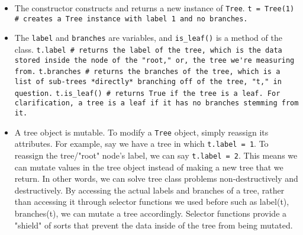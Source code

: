 \vspace{2mm}
\begin{itemize}
\item The constructor constructs and returns a new instance of \lstinline{Tree}.
    \subitem \lstinline{t = Tree(1) # creates a Tree instance with label 1 and no branches.}
\item The \lstinline{label} and \lstinline{branches} are variables, and \lstinline{is_leaf()} is a method of the class.
    \subitem \lstinline{t.label # returns the label of the tree, which is the data stored inside the node of the "root," or, the tree we're measuring from.}
    \subitem \lstinline{t.branches # returns the branches of the tree, which is a list of sub-trees *directly* branching off of the tree, "t," in question.}
    \subitem \lstinline{t.is_leaf() # returns True if the tree is a leaf. For clarification, a tree is a leaf if it has no branches stemming from it.}
\item A tree object is mutable.
    \subitem To modify a \lstinline{Tree} object, simply reassign its attributes. For example, say we have a tree in which \lstinline{t.label = 1}. To reassign the tree/"root" node's label, we can say \lstinline{t.label = 2}.
    \subitem This means we can mutate values in the tree object instead of making a new tree that we return. In other words, we can solve tree class problems non-destructively and destructively.
    \subitem By accessing the actual labels and branches of a tree, rather than accessing it through selector functions we used before such as label(t), branches(t), we can mutate a tree accordingly. Selector functions provide a "shield" of sorts that prevent the data inside of the tree from being mutated.
\end{itemize}